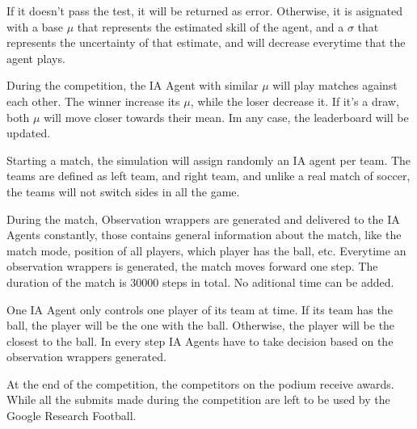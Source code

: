If it doesn't pass the test, it will be returned as error. Otherwise, it is asignated with a base $\mu$ that represents the estimated skill of the agent, and a $\sigma$ that represents the uncertainty of that estimate, and will decrease everytime that the agent plays.

During the competition, the IA Agent with similar $\mu$ will play matches against each other. The winner increase its $\mu$, while the loser decrease it. If it's a draw, both $\mu$ will move closer towards their mean. Im any case, the leaderboard will be updated.

Starting a match, the simulation will assign randomly an IA agent per team. The teams are defined as left team, and right team, and unlike a real match of soccer, the teams will not switch sides in all the game.

During the match, Observation wrappers are generated and delivered to the IA Agents constantly, those contains general information about the match, like the match mode, position of all players, which player has the ball, etc. Everytime an observation wrappers is generated, the match moves forward one step. The duration of the match is 30000 steps in total. No aditional time can be added.

One IA Agent only controls one player of its team at time. If its team has the ball, the player will be the one with the ball. Otherwise, the player will be the closest to the ball. In every step IA Agents have to take decision based on the observation wrappers generated.

At the end of the competition, the competitors on the podium receive awards. While all the submits made during the competition are left to be used by the Google Research Football.